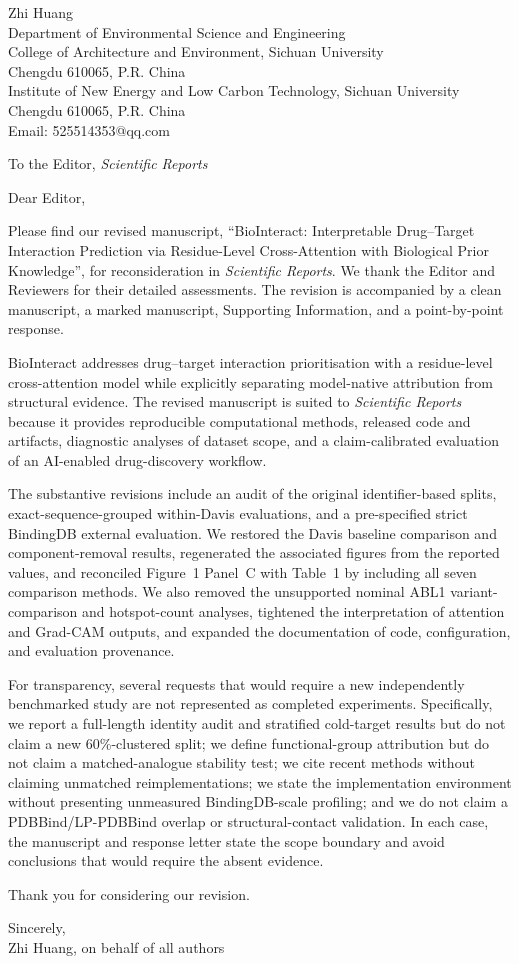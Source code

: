 \documentclass[11pt]{article}
\begin{document}
\begin{flushright}
Zhi Huang\\
Department of Environmental Science and Engineering\\
College of Architecture and Environment, Sichuan University\\
Chengdu 610065, P.R. China\\
Institute of New Energy and Low Carbon Technology, Sichuan University\\
Chengdu 610065, P.R. China\\
Email: 525514353@qq.com
\end{flushright}

\vspace{1em}
\noindent To the Editor, \textit{Scientific Reports}

\vspace{1em}
\noindent Dear Editor,

Please find our revised manuscript, ``BioInteract: Interpretable Drug--Target
Interaction Prediction via Residue-Level Cross-Attention with Biological Prior
Knowledge'', for reconsideration in \textit{Scientific Reports}. We thank the
Editor and Reviewers for their detailed assessments. The revision is accompanied
by a clean manuscript, a marked manuscript, Supporting Information, and a
point-by-point response.

BioInteract addresses drug--target interaction prioritisation with a
residue-level cross-attention model while explicitly separating model-native
attribution from structural evidence. The revised manuscript is suited to
\textit{Scientific Reports} because it provides reproducible computational
methods, released code and artifacts, diagnostic analyses of dataset scope, and
a claim-calibrated evaluation of an AI-enabled drug-discovery workflow.

The substantive revisions include an audit of the original identifier-based
splits, exact-sequence-grouped within-Davis evaluations, and a pre-specified
strict BindingDB external evaluation. We restored the Davis baseline comparison
and component-removal results, regenerated the associated figures from the
reported values, and reconciled Figure~1 Panel~C with Table~1 by including all
seven comparison methods. We also removed the unsupported nominal ABL1
variant-comparison and hotspot-count analyses, tightened the interpretation of
attention and Grad-CAM outputs, and expanded the documentation of code,
configuration, and evaluation provenance.

For transparency, several requests that would require a new independently
benchmarked study are not represented as completed experiments. Specifically,
we report a full-length identity audit and stratified cold-target results but do
not claim a new 60\%-clustered split; we define functional-group attribution but
do not claim a matched-analogue stability test; we cite recent methods without
claiming unmatched reimplementations; we state the implementation environment
without presenting unmeasured BindingDB-scale profiling; and we do not claim a
PDBBind/LP-PDBBind overlap or structural-contact validation. In each case, the
manuscript and response letter state the scope boundary and avoid conclusions
that would require the absent evidence.

Thank you for considering our revision.

\vspace{1em}
\noindent Sincerely,\\
Zhi Huang, on behalf of all authors
\end{document}
